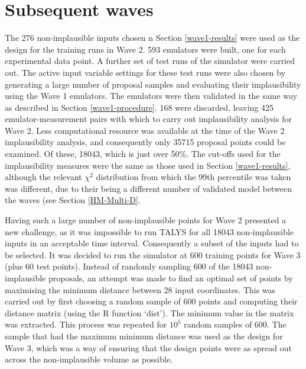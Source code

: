 \documentclass[
  12pt,
  a4paper,
  twoside]{book}
\begin{document}
\hypertarget{subsequent-waves}{%
\section{Subsequent waves}\label{subsequent-waves}}

The 276 non-implausible inputs chosen n Section \ref{wave1-results} were used as the design for the training runs in Wave 2. 593 emulators were built, one for each experimental data point. A further set of test runs of the simulator were carried out. The active input variable settings for these test runs were also chosen by generating a large number of proposal samples and evaluating their implausibility using the Wave 1 emulators. The emulators were then validated in the same way as described in Section \ref{wave1-procedure}. 168 were discarded, leaving 425 emulator-measurement pairs with which to carry out implausibility analysis for Wave 2. Less computational resource was available at the time of the Wave 2 implausibility analysis, and consequently only 35715 proposal points could be examined. Of these, 18043, which is just over 50\%. The cut-offs used for the implausibility measures were the same as those used in Section \ref{wave1-results}, although the relevant \(\chi^2\) distribution from which the 99th percentile was taken was different, due to their being a different number of validated model between the waves (see Section \ref{HM-Multi-D}.

Having such a large number of non-implausible points for Wave 2 presented a new challenge, as it was impossible to run TALYS for all 18043 non-implausible inputs in an acceptable time interval. Consequently a subset of the inputs had to be selected. It was decided to run the simulator at 600 training points for Wave 3 (plus 60 test points). Instead of randomly sampling 600 of the 18043 non-implausible proposals, an attempt was made to find an optimal set of points by maximising the minimum distance between 28 input coordinates. This was carried out by first choosing a random sample of 600 points and computing their distance matrix (using the R function `dist'). The minimum value in the matrix was extracted. This process was repeated for \(10^5\) random samples of 600. The sample that had the maximum minimum distance was used as the design for Wave 3, which was a way of ensuring that the design points were as spread out across the non-implausible volume as possible.
\end{document}
